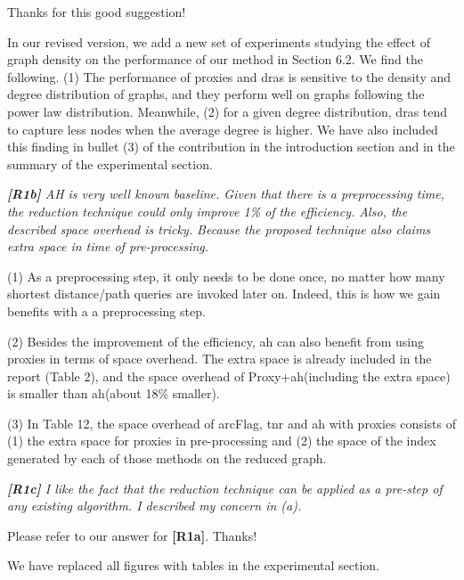 \documentclass[11pt]{letter}
\newcommand{\svs}{\vspace{0.36ex}}
\newcommand{\ah}{{\sc ah}\xspace}
\newcommand{\arcflag}{{\sc arcFlag}\xspace}
\newcommand{\tnr}{{\sc tnr}\xspace}
\newcommand{\dras}{{\sc dra}s\xspace}
\begin{document}
Thanks for this good suggestion! 

In our revised version, we add a new set of experiments studying the effect of graph density on the performance of our method in Section 6.2. 
We find the following. (1) The performance of proxies and \dras is sensitive to the density and degree distribution of graphs, and they perform well on graphs following the power law distribution. Meanwhile, (2) for a given degree distribution, \dras tend to capture less nodes when the average degree is higher.
We have also included this finding in bullet (3) of the contribution in the introduction section and in the summary of the experimental section.


\noindent
{\em
{\bf [R1b]}   AH is very well known baseline. Given that there is a preprocessing time, the reduction technique could only improve 1\% of the efficiency. Also, the described space overhead is tricky. Because the proposed technique also claims extra space in time of pre-processing.}
\svs

(1) As a preprocessing step, it only needs to be done once, no matter how many shortest distance/path queries are invoked later on. Indeed, this is how we gain benefits with a a preprocessing step.

(2) Besides the improvement of the efficiency, \ah can also benefit from using proxies in terms of space overhead. The extra space is already included in the report (Table 2), and the space overhead of Proxy+\ah (including the extra space) is smaller than \ah (about 18\% smaller).

(3) In Table 12, the space overhead of \arcflag, \tnr and \ah with proxies consists of (1) the extra space for proxies in pre-processing and (2) the space of the index generated by each of those methods on the reduced graph.



\noindent
{\em{\bf[R1c]} I like the fact that the reduction technique can be applied as a pre-step of any existing algorithm. I described my concern in (a).}
\svs

Please refer to our answer for {\bf [R1a]}. Thanks!


\svs

We have replaced all figures with tables in the experimental section.


\svs
\end{document}
